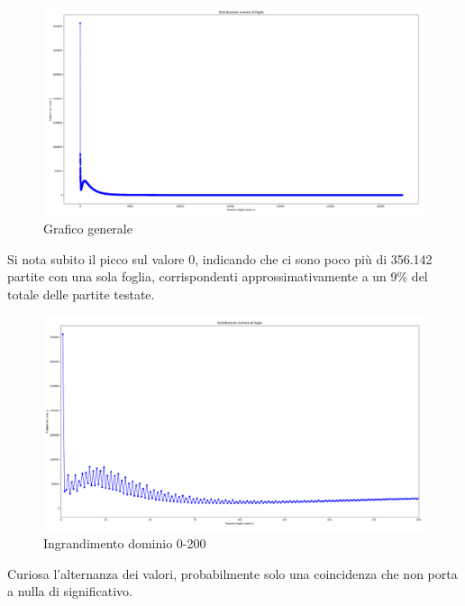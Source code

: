 \documentclass[a4paper,12pt]{report} %
\begin{document}
\begin{figure}[h!]
    \centering
    \includegraphics[width=1\textwidth]{imgs/grafico_base.png} %
    \caption{Grafico generale}
    \label{fig:etichetta}
\end{figure}

Si nota subito il picco sul valore 0, indicando che ci sono poco più di 356.142 partite con una sola foglia, corrispondenti approssimativamente a un 9\% del totale delle partite testate.


\begin{figure}[h!]
    \centering
    \includegraphics[width=1\textwidth]{imgs/grafico_0_200.png} %
    \caption{Ingrandimento dominio 0-200}
    \label{fig:etichetta}
\end{figure}

Curiosa l'alternanza dei valori, probabilmente solo una coincidenza che non porta a nulla di significativo.
\end{document}
